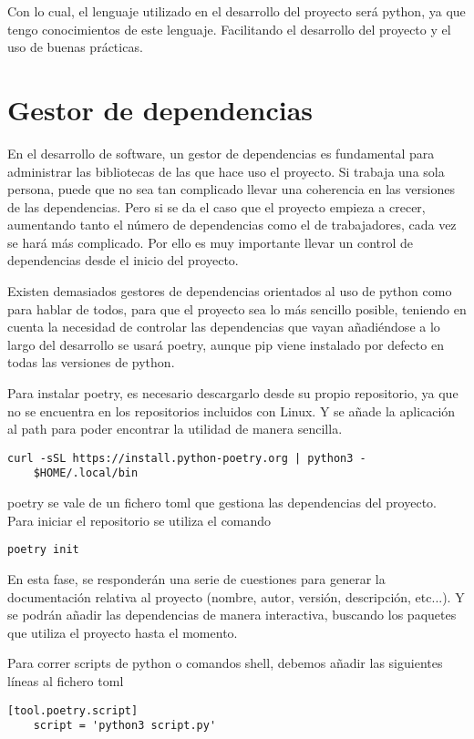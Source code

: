 Con lo cual, el lenguaje utilizado en el desarrollo del proyecto será \Gls{python}, ya que tengo conocimientos de este lenguaje. Facilitando el desarrollo del proyecto y el uso de buenas prácticas. 

\section{Gestor de dependencias}
En el desarrollo de software, un gestor de \glspl{dependencia} es fundamental para administrar las bibliotecas de las que hace uso el proyecto. Si trabaja una sola persona, puede que no sea tan complicado llevar una coherencia en las versiones de las \glspl{dependencia}. Pero si se da el caso que el proyecto empieza a crecer, aumentando tanto el número de \glspl{dependencia} como el de trabajadores, cada vez se hará más complicado. Por ello es muy importante llevar un control de \glspl{dependencia} desde el inicio del proyecto.

Existen demasiados gestores de \glspl{dependencia} orientados al uso de \Gls{python} como para hablar de todos, para que el proyecto sea lo más sencillo posible, teniendo en cuenta la necesidad de controlar las \glspl{dependencia} que vayan añadiéndose a lo largo del desarrollo se usará \Gls{poetry}, aunque \Gls{pip} viene instalado por defecto en todas las versiones de \Gls{python}. 

Para instalar \gls{poetry}, es necesario descargarlo desde su propio repositorio, ya que no se encuentra en los repositorios incluidos con Linux. Y se añade la aplicación al \gls{path} para poder encontrar la utilidad de manera sencilla.
\begin{lstlisting}[style=consola]
	curl -sSL https://install.python-poetry.org | python3 -
	$HOME/.local/bin
\end{lstlisting}

\gls{poetry} se vale de un fichero \gls{toml} que gestiona las \glspl{dependencia} del proyecto. Para iniciar el \gls{repositorio} se utiliza el comando
\begin{lstlisting}[style=consola]
	poetry init
\end{lstlisting}

En esta fase, se responderán una serie de cuestiones para generar la documentación relativa al proyecto (nombre, autor, versión, descripción, etc...). Y se podrán añadir las \glspl{dependencia} de manera interactiva, buscando los paquetes que utiliza el proyecto hasta el momento.

Para correr \glspl{script} de \gls{python} o comandos \gls{shell}, debemos añadir las siguientes líneas al fichero \gls{toml}
\begin{lstlisting}[style=consola]
	[tool.poetry.script]
	script = 'python3 script.py'
\end{lstlisting}

